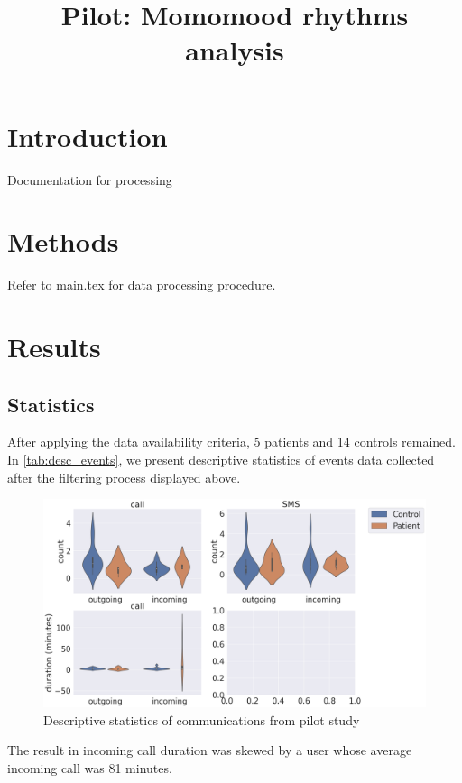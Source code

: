 \documentclass[journal, onecolumn, 11pt]{IEEEtran}
\begin{document}
\title{Pilot: Momomood rhythms analysis}
\maketitle


\IEEEpeerreviewmaketitle

\section{Introduction}
Documentation for processing

\section{Methods}
Refer to main.tex for data processing procedure.

\section{Results}

\subsection{Statistics}


After applying the data availability criteria, 5 patients and 14 controls remained. In \autoref{tab:desc_events}, we present descriptive statistics of events data collected after the filtering process displayed above.


\begin{figure}[htbp]
  \centering
  \includegraphics[width=\textwidth]{pilot_figs/1_pilot_descriptive_comm.png}
  \caption{Descriptive statistics of communications from pilot study}
\end{figure}

The result in incoming call duration was skewed by a user whose average incoming call was 81 minutes.
\end{document}
